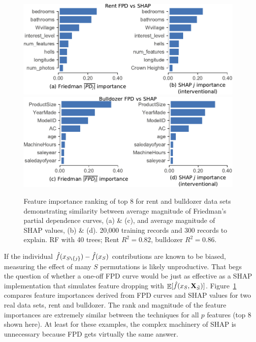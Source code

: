 \documentclass[11pt]{article}
\newcommand{\figref}[1]{Figure~\ref{#1}}
\DeclareMathOperator{\Ex}{\mathbb{E}}
\begin{document}
\begin{figure}[htbp]
\begin{center}
\includegraphics[scale=0.53]{images/rent-pdp-vs-shap.pdf}\includegraphics[scale=0.53]{images/bulldozer-pdp-vs-shap.pdf}
\caption[short]{\small  Feature importance ranking of top 8 for rent and bulldozer data sets demonstrating similarity between average magnitude of Friedman's partial dependence curves, (a) \& (c), and average magnitude of SHAP values, (b) \& (d). 20,000 training records and 300 records to explain. RF with 40 trees; Rent $R^2 = 0.82$, bulldozer $R^2 = 0.86$.}
\label{fig:fpd_imp}
\end{center}
\end{figure}

If the individual $\hat{f}(x_{S \texttt{\char`\\} \{j\}}) - \hat{f}(x_{S})$ contributions are known to be biased, measuring the effect of many $S$ permutations is likely unproductive. That begs the question of whether a one-off FPD curve would be just as effective as a SHAP implementation that  simulates feature dropping with $\Ex[\hat{f}(x_{S},{\bf X}_{\bar{S}})]$.  \figref{fig:fpd_imp} compares feature importances derived from FPD curves and SHAP values for two real data sets, rent and bulldozer. The rank and magnitude of the feature importances are extremely similar between the techniques for all $p$ features (top 8 shown here). At least for these examples, the complex machinery of SHAP is unnecessary because FPD gets virtually the same answer.
\end{document}
